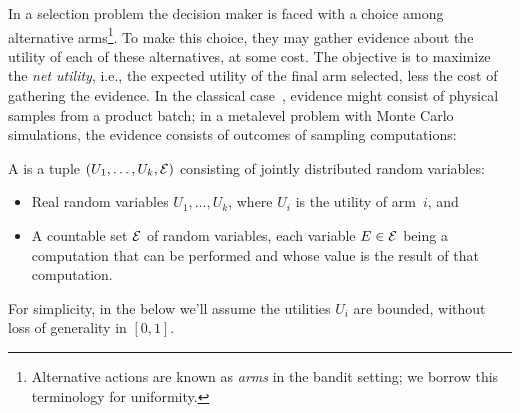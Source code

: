 




In a selection problem the decision maker is faced with a choice among
alternative arms\footnote{Alternative actions are known as \emph{arms} in the bandit setting;
we borrow this terminology for uniformity.}.  To make this choice, they may gather evidence about the
utility of each of these alternatives, at some cost.  The objective is to maximize
the {\em net utility}, i.e., the expected utility of the final arm selected, less the cost of gathering the evidence. 
In the classical case~\citep{Bechhofer:1954}, evidence might consist of physical samples
from a product batch; in a metalevel problem with Monte Carlo simulations,
the evidence consists of outcomes of sampling computations:

\begin{dfn} \label{dfn:metalevel-model}
	A  is a tuple $(U_1,\dots,U_k,\mathcal{E})$ 
	consisting of jointly distributed random variables:
	\begin{itemize}
		\item Real random variables $U_1,\dots,U_k$, where $U_i$ is the utility of arm~$i$, and
		\item A countable set $\mathcal{E}$ of random variables, each variable $E\in\mathcal{E}$ being 
		      a computation that can be performed and whose value is the result of that computation.
	\end{itemize}
\end{dfn}
For simplicity, in the below we'll assume the utilities $U_i$ are bounded, 
without loss of generality in $[0,1]$.

